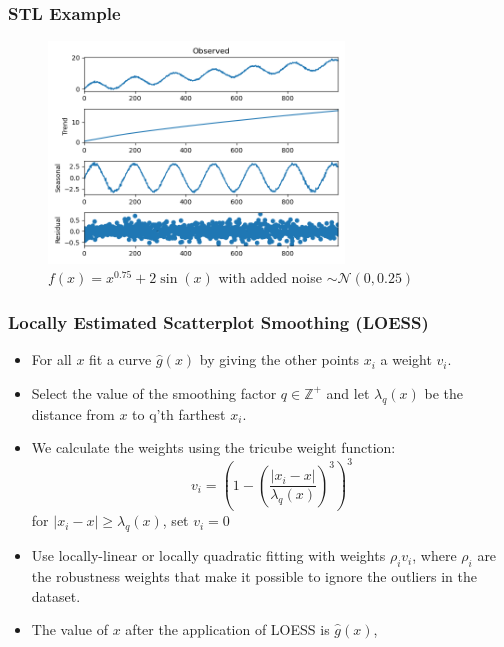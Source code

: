 \documentclass[9pt]{beamer}
\begin{document}
\begin{frame}
  \frametitle{STL Example}
  \begin{figure}[H]
    \centering
    \includegraphics[width=0.7\textwidth]{imgs/stl1.png}
    \caption{$f(x) = x^{0.75} + 2\sin(x)$ with added noise
      $\sim \mathcal{N}(0, 0.25)$}
  \end{figure}
  \centering
\end{frame}


\begin{frame}
\frametitle{Locally Estimated Scatterplot Smoothing (LOESS)}
\begin{itemize}
  \item For all $x$ fit a curve $\hat{g}(x)$ by giving the other points $x_i$ a
  weight $v_i$.
\item Select the value of the smoothing factor $q \in \mathbb{Z}^+$ and let
  $\lambda_q(x)$ be the distance from $x$ to q'th farthest $x_i$.
\item We calculate the weights using the tricube weight function:
  \[
  v_i = \left( 1 - \left( \frac{| x_i - x |}{\lambda_q(x)}  \right)^3\right)^3
  \]
  for $| x_i - x | \geq \lambda_q(x)$, set $v_i = 0$
\item Use locally-linear or locally quadratic fitting with weights
  $\rho_i v_i$, where $\rho_i$ are the robustness weights that make it possible to 
  ignore the outliers in the dataset.
\item The value of $x$ after the application of LOESS is $\hat{g}(x)$,
\end{itemize}
\end{frame}
\end{document}
